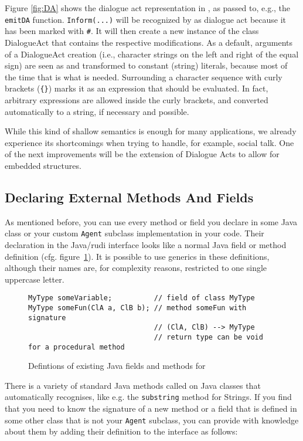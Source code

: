 Figure \ref{fig:DA} shows the dialogue act representation in \vonda, as passed
to, e.g., the \texttt{emitDA} function. \texttt{Inform}\verb|(...)| will be
recognized by \vonda as dialogue act because it has been marked with
\verb|#|. It will then create a new instance of the class DialogueAct that
contains the respective modifications. As a default, arguments of a DialogueAct
creation (i.e., character strings on the left and right of the equal sign) are
seen as and transformed to constant (string) literals, because most of the time
that is what is needed.  Surrounding a character sequence with curly brackets
(\texttt{\{\}}) marks it as an expression that should be evaluated. In fact,
arbitrary expressions are allowed inside the curly brackets, and converted
automatically to a string, if necessary and possible.

While this kind of shallow semantics is enough for many applications, we
already experience its shortcomings when trying to handle, for example, social
talk. One of the next improvements will be the extension of Dialogue Acts to
allow for embedded structures.


\subsection{Declaring External Methods And Fields}
\label{sec:javatypes}

As mentioned before, you can use every method or field you declare in
some Java class or your custom \texttt{Agent} subclass implementation
in your \vonda code. Their declaration in the Java/rudi interface
looks like a normal Java field or method definition
(cfg. figure~\ref{tab:javadef}). It is possible to use generics in
these definitions, although their names are, for complexity reasons,
restricted to one single uppercase letter.

\begin{figure}[htbp]
\small
\begin{lstlisting}
MyType someVariable;          // field of class MyType
MyType someFun(ClA a, ClB b); // method someFun with signature
                              // (ClA, ClB) --> MyType
                              // return type can be void for a procedural method
\end{lstlisting}\vspace*{-2ex}
\caption{\label{tab:javadef}Defintions of existing Java fields and methods for
  \vonda}
\end{figure}

There is a variety of standard Java methods called on Java classes that \vonda
automatically recognises, like e.g. the \texttt{substring} method for
Strings. If you find that you need \vonda to know the signature of a new method
or a field that is defined in some other class that is not your \texttt{Agent}
subclass, you can provide \vonda with knowledge about them by adding their
definition to the interface as follows:

